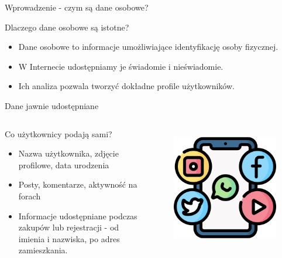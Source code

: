 
\begin{frame}{Wprowadzenie - czym są dane osobowe?}
    \begin{alertblock}{Dlaczego dane osobowe są istotne?}
      \begin{itemize}
        \item Dane osobowe to informacje umożliwiające identyfikację osoby fizycznej.\cite{PII_USDE}
        \item W Internecie udostępniamy je świadomie i nieświadomie.
        \item Ich analiza pozwala tworzyć dokładne profile użytkowników.
      \end{itemize}
    \end{alertblock}
  \end{frame}
  
  \begin{frame}{Dane jawnie udostępniane}
  \begin{columns}[c]
      \begin{alertblock}{Co użytkownicy podają sami?}
        \begin{itemize}
          \item Nazwa użytkownika, zdjęcie profilowe, data urodzenia
          \item Posty, komentarze, aktywność na forach
          \item Informacje udostępniane podczas zakupów lub rejestracji - od imienia i nazwiska, po adres zamieszkania.\cite{CYB_DEF_NAJCZĘSTRZE_DANE}
        \end{itemize}
      \end{alertblock}
      \begin{figure}
        \centering
        \includegraphics[height=0.45\textheight]{images/social-media.png}
        \label{fig:social-media}
      \end{figure}
  \end{columns}
  \end{frame}
  
